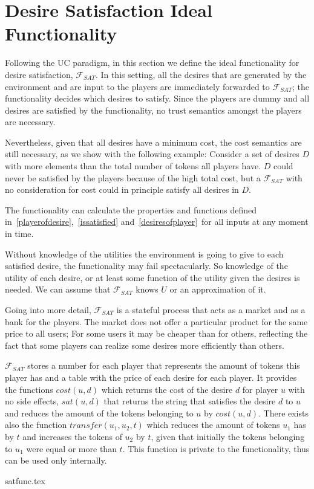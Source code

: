 \section{Desire Satisfaction Ideal Functionality}
  Following the UC paradigm, in this section we define the ideal functionality for desire
  satisfaction, $\mathcal{F}_{SAT}$.  In this setting, all the desires that are generated
  by the environment and are input to the players are immediately forwarded to
  $\mathcal{F}_{SAT}$; the functionality decides which desires to satisfy. Since the
  players are dummy and all desires are satisfied by the functionality, no trust semantics
  amongst the players are necessary.

  Nevertheless, given that all desires have a minimum cost, the cost semantics are still
  necessary, as we show with the following example: Consider a set of desires $D$ with
  more elements than the total number of tokens all players have. $D$ could never be
  satisfied by the players because of the high total cost, but a $\mathcal{F}_{SAT}$ with
  no consideration for cost could in principle satisfy all desires in $D$.

  The functionality can calculate the properties and functions defined
  in~\ref{playerofdesire},~\ref{issatisfied} and~\ref{desiresofplayer}\ for all inputs at
  any moment in time.

  Without knowledge of the utilities the environment is going to give to each satisfied
  desire, the functionality may fail spectacularly. So knowledge of the utility of each
  desire, or at least some function of the utility given the desires is needed. We can
  assume that $\mathcal{F}_{SAT}$ knows $U$ or an approximation of it.

  Going into more detail, $\mathcal{F}_{SAT}$ is a stateful process that acts as a market
  and as a bank for the players. The market does not offer a particular product for the
  same price to all users; For some users it may be cheaper than for others, reflecting
  the fact that some players can realize some desires more efficiently than others.

  $\mathcal{F}_{SAT}$ stores a number for each player that represents the amount of tokens
  this player has and a table with the price of each desire for each player. It provides
  the functions $cost\left(u, d\right)$ which returns the cost of the desire $d$ for
  player $u$ with no side effects, $sat\left(u, d\right)$ that returns the string that
  satisfies the desire $d$ to $u$ and reduces the amount of the tokens belonging to $u$ by
  $cost\left(u, d\right)$. There exists also the function $transfer\left(u_1, u_2,
  t\right)$ which reduces the amount of tokens $u_1$ has by $t$ and increases the tokens
  of $u_2$ by $t$, given that initially the tokens belonging to $u_1$ were equal or more
  than $t$. This function is private to the functionality, thus can be used only
  internally.

  {satfunc.tex}
